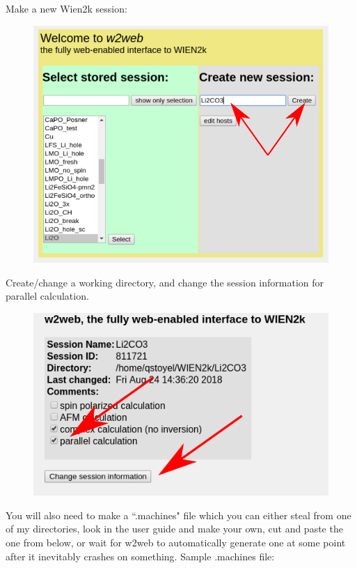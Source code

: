 \documentclass[12pt]{article}
\begin{document}
Make a new Wien2k session: 
\begin{figure}[H]
\includegraphics[scale=0.3]{./images/new_session.png}
\end{figure}

Create/change a working directory, and change the session information for parallel calculation.
	
	\begin{figure}[H]
		\includegraphics[scale=0.5]{./images/parallel.png}
	\end{figure}
	
You will also need to make a ``.machines" file which you can either steal from one of my directories, look in the user guide and make your own, cut and paste the one from below, or wait for w2web to automatically generate one at some point after it inevitably crashes on something.
Sample .machines file: 
\end{document}
